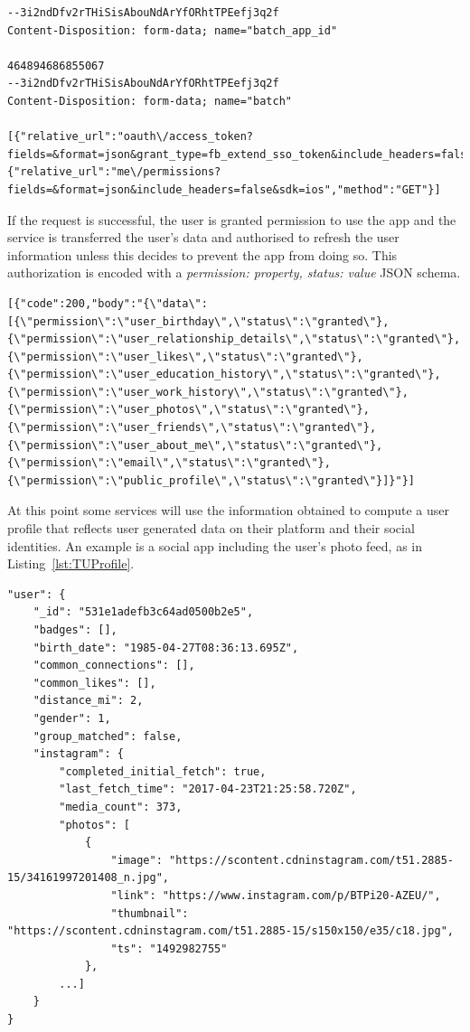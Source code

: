 \begin{lstlisting}
--3i2ndDfv2rTHiSisAbouNdArYfORhtTPEefj3q2f
Content-Disposition: form-data; name="batch_app_id"

464894686855067
--3i2ndDfv2rTHiSisAbouNdArYfORhtTPEefj3q2f
Content-Disposition: form-data; name="batch"

[{"relative_url":"oauth\/access_token?fields=&format=json&grant_type=fb_extend_sso_token&include_headers=false&sdk=ios","method":"GET"},{"relative_url":"me\/permissions?fields=&format=json&include_headers=false&sdk=ios","method":"GET"}]
\end{lstlisting}

If the request is successful, the user is granted permission to use the app and the service is transferred the user's data and authorised to refresh the user information unless this decides to prevent the app from doing so. This authorization is encoded with a \emph{permission: property, status: value} JSON schema. 

\begin{lstlisting}
[{"code":200,"body":"{\"data\":[{\"permission\":\"user_birthday\",\"status\":\"granted\"},{\"permission\":\"user_relationship_details\",\"status\":\"granted\"},{\"permission\":\"user_likes\",\"status\":\"granted\"},{\"permission\":\"user_education_history\",\"status\":\"granted\"},{\"permission\":\"user_work_history\",\"status\":\"granted\"},{\"permission\":\"user_photos\",\"status\":\"granted\"},{\"permission\":\"user_friends\",\"status\":\"granted\"},{\"permission\":\"user_about_me\",\"status\":\"granted\"},{\"permission\":\"email\",\"status\":\"granted\"},{\"permission\":\"public_profile\",\"status\":\"granted\"}]}"}]
\end{lstlisting}

At this point some services will use the information obtained to compute a user profile that reflects user generated data on their platform and their social identities. An example is a social app including the user's photo feed, as in Listing~\ref{lst:TUProfile}.

\begin{lstlisting}
"user": {
    "_id": "531e1adefb3c64ad0500b2e5",
    "badges": [],
    "birth_date": "1985-04-27T08:36:13.695Z",                
    "common_connections": [],
    "common_likes": [],
    "distance_mi": 2,
    "gender": 1,
    "group_matched": false,
    "instagram": {
        "completed_initial_fetch": true,
        "last_fetch_time": "2017-04-23T21:25:58.720Z",
        "media_count": 373,
        "photos": [
            {
                "image": "https://scontent.cdninstagram.com/t51.2885-15/34161997201408_n.jpg",
                "link": "https://www.instagram.com/p/BTPi20-AZEU/",
                "thumbnail": "https://scontent.cdninstagram.com/t51.2885-15/s150x150/e35/c18.jpg",
                "ts": "1492982755"
            },
        ...]
    }
}
\end{lstlisting}

